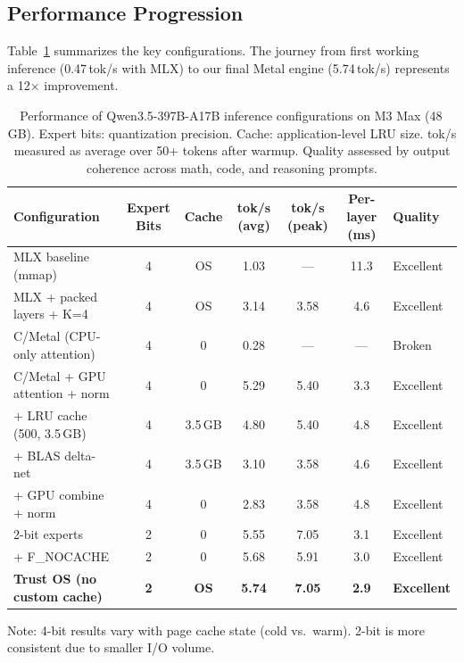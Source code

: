 \documentclass[11pt,twocolumn]{article}
\begin{document}
\subsection{Performance Progression}

Table~\ref{tab:configs} summarizes the key configurations.
The journey from first working inference (0.47\,tok/s with MLX) to our final Metal engine (5.74\,tok/s) represents a 12$\times$ improvement.

\begin{table}[t]
\centering
\small
\caption{Performance of Qwen3.5-397B-A17B inference configurations on M3 Max (48\,GB). Expert bits: quantization precision. Cache: application-level LRU size. tok/s measured as average over 50+ tokens after warmup. Quality assessed by output coherence across math, code, and reasoning prompts.}
\label{tab:configs}
\begin{tabular}{@{}lcccccl@{}}
\toprule
\textbf{Configuration} & \textbf{Expert Bits} & \textbf{Cache} & \textbf{tok/s (avg)} & \textbf{tok/s (peak)} & \textbf{Per-layer (ms)} & \textbf{Quality} \\
\midrule
MLX baseline (mmap) & 4 & OS & 1.03 & --- & 11.3 & Excellent \\
MLX + packed layers + K=4 & 4 & OS & 3.14 & 3.58 & 4.6 & Excellent \\
\midrule
C/Metal (CPU-only attention) & 4 & 0 & 0.28 & --- & --- & Broken \\
C/Metal + GPU attention + norm & 4 & 0 & 5.29 & 5.40 & 3.3 & Excellent \\
\quad + LRU cache (500, 3.5\,GB) & 4 & 3.5\,GB & 4.80 & 5.40 & 4.8 & Excellent \\
\quad + BLAS delta-net & 4 & 3.5\,GB & 3.10 & 3.58 & 4.6 & Excellent \\
\quad + GPU combine + norm & 4 & 0 & 2.83 & 3.58 & 4.8 & Excellent \\
\midrule
2-bit experts & 2 & 0 & 5.55 & 7.05 & 3.1 & Excellent \\
\quad + F\_NOCACHE & 2 & 0 & 5.68 & 5.91 & 3.0 & Excellent \\
\midrule
\textbf{Trust OS (no custom cache)} & \textbf{2} & \textbf{OS} & \textbf{5.74} & \textbf{7.05} & \textbf{2.9} & \textbf{Excellent} \\
\bottomrule
\end{tabular}
\vspace{1mm}

\footnotesize{Note: 4-bit results vary with page cache state (cold vs.\ warm). 2-bit is more consistent due to smaller I/O volume.}
\end{table}
\end{document}
